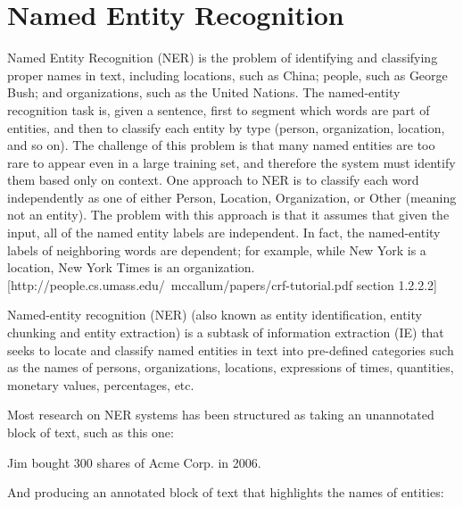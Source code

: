 \documentclass[thesis=M,english]{FITthesis}[2018/05/30]
\begin{document}
\section{Named Entity Recognition}
Named Entity Recognition (NER) is the problem of identifying and classifying proper names in text, including locations, such as China; people, such as George Bush; and organizations, such as the United Nations. The named-entity recognition task is, given a sentence, first to segment which words are part of entities, and then to classify each entity by type (person, organization, location, and so on). The challenge of this problem is that many named entities are too rare to appear even in a large training set, and therefore the system must identify them based only on context.
\linebreak One approach to NER is to classify each word independently as one of either Person, Location, Organization, or Other (meaning not an entity). The problem with this approach is that it assumes that given the input, all of the named entity labels are independent. In fact, the named-entity labels of neighboring words are dependent; for example, while New York is a location, New York Times is an organization. [http://people.cs.umass.edu/~mccallum/papers/crf-tutorial.pdf section 1.2.2.2]


Named-entity recognition (NER) (also known as entity identification, entity chunking and entity extraction) is a subtask of information extraction (IE) that seeks to locate and classify named entities in text into pre-defined categories such as the names of persons, organizations, locations, expressions of times, quantities, monetary values, percentages, etc.

Most research on NER systems has been structured as taking an unannotated block of text, such as this one:

Jim bought 300 shares of Acme Corp. in 2006.

And producing an annotated block of text that highlights the names of entities:
\end{document}
